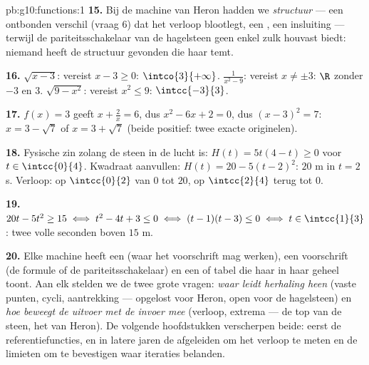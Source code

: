 \begin{solution}{pb:g10:functions:1}
\textbf{15.} Bij de machine van Heron hadden we \emph{structuur} --- een
ontbonden verschil (vraag 6) dat het verloop blootlegt, een , een
insluiting --- terwijl de pariteitsschakelaar van de hagelsteen geen enkel
zulk houvast biedt: niemand heeft de structuur gevonden die haar temt.

\textbf{16.} $\sqrt{x - 3}$: vereist $x - 3 \geq 0$: $\intco{3}{+\infty}$.
$\frac{1}{x^2 - 9}$: vereist $x \neq \pm 3$: $\R$ zonder $-3$ en $3$.
$\sqrt{9 - x^2}$: vereist $x^2 \leq 9$: $\intcc{-3}{3}$.

\textbf{17.} $f(x) = 3$ geeft $x + \frac2x = 6$, dus $x^2 - 6x + 2 = 0$, dus
$(x - 3)^2 = 7$: $x = 3 - \sqrt7$ of $x = 3 + \sqrt7$ (beide positief: twee
exacte originelen).

\textbf{18.} Fysische zin zolang de steen in de lucht is:
$H(t) = 5t(4 - t) \geq 0$ voor $t \in \intcc{0}{4}$. Kwadraat aanvullen:
$H(t) = 20 - 5(t - 2)^2$:  $20$ m in $t = 2$ s. Verloop:  op
$\intcc{0}{2}$ van $0$ tot $20$,  op $\intcc{2}{4}$ terug tot $0$.

\textbf{19.} $20t - 5t^2 \geq 15 \iff t^2 - 4t + 3 \leq 0 \iff
(t - 1)(t - 3) \leq 0 \iff t \in \intcc{1}{3}$: twee volle seconden boven
$15$ m.

\textbf{20.} Elke machine heeft een  (waar het voorschrift mag
werken), een voorschrift (de formule of de pariteitsschakelaar) en een
 of tabel die haar in haar geheel toont. Aan elk stelden we de twee
grote vragen: \emph{waar leidt herhaling heen} (vaste punten, cycli,
aantrekking --- opgelost voor Heron, open voor de hagelsteen) en \emph{hoe
beweegt de uitvoer met de invoer mee} (verloop, extrema --- de top van de
steen, het  van Heron). De volgende hoofdstukken verscherpen beide:
eerst de referentiefuncties, en in latere jaren de afgeleiden om het
verloop te meten en de limieten om te bevestigen waar iteraties belanden.
\end{solution}
